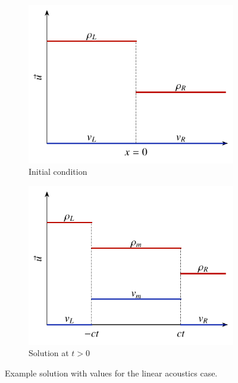 \begin{figure}[htbp]
	\centering
	\begin{subfigure}[b]{0.49\textwidth}
		\includegraphics[width=\linewidth]{Pictures/ch11_riem_linacoustics_u0}
		\caption{Initial condition}
		\label{fig:riem_acoustics_example_u0}
	\end{subfigure}
	\begin{subfigure}[b]{0.49\textwidth}
		\includegraphics[width=\linewidth]{Pictures/ch11_riem_linacoustics_sol}
		\caption{Solution at $t>0$}
		\label{fig:riem_acoustics_example_sol}
	\end{subfigure}
	\caption{Example solution with values for the linear acoustics case.}
	\label{fig:riem_acoustics_example}
\end{figure}
